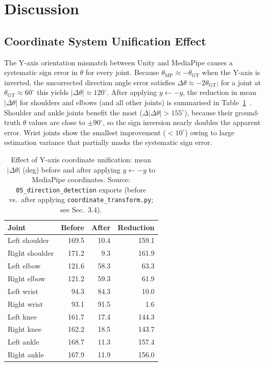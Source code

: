 \documentclass[english,fleqn]{ieej-e}
\begin{document}
\section{Discussion}

\subsection{Coordinate System Unification Effect}

The Y-axis orientation mismatch between Unity and MediaPipe causes a
systematic sign error in $\theta$ for every joint. Because
$\theta_{\text{MP}} \approx -\theta_{\text{GT}}$ when the Y-axis is
inverted, the uncorrected direction angle error satisfies
$\Delta\theta \approx -2\theta_{\text{GT}}$; for a joint at
$\theta_{\text{GT}} \approx 60^{\circ}$ this yields $|\Delta\theta| \approx 120^{\circ}$.
After applying $y \leftarrow -y$, the reduction in mean $|\Delta\theta|$
for shoulders and elbows (and all other joints) is summarised in
Table~\ref{tab:yflip_effect}~\cite{mediapipe_coord_issue}.
Shoulder and ankle joints benefit the most ($\Delta|\Delta\theta|>155^{\circ}$),
because their ground-truth $\theta$ values are close to $\pm90^{\circ}$,
so the sign inversion nearly doubles the apparent error.
Wrist joints show the smallest improvement ($<10^{\circ}$) owing to
large estimation variance that partially masks the systematic sign error.

\begin{table}[!t]
\centering
\caption{Effect of Y-axis coordinate unification: mean $|\Delta\theta|$ (deg)
  before and after applying $y \leftarrow -y$ to MediaPipe coordinates.
  Source: \texttt{05\_direction\_detection} exports (before vs.\ after
  applying \texttt{coordinate\_transform.py}; see Sec.~3.4).}
\label{tab:yflip_effect}
\small
\begin{tabular}{lrrr}
\toprule
Joint          & Before & After & Reduction \\
\midrule
Left shoulder  & 169.5 & 10.4 & 159.1 \\
Right shoulder & 171.2 &  9.3 & 161.9 \\
Left elbow     & 121.6 & 58.3 &  63.3 \\
Right elbow    & 121.2 & 59.3 &  61.9 \\
Left wrist     &  94.3 & 84.3 &  10.0 \\
Right wrist    &  93.1 & 91.5 &   1.6 \\
Left knee      & 161.7 & 17.4 & 144.3 \\
Right knee     & 162.2 & 18.5 & 143.7 \\
Left ankle     & 168.7 & 11.3 & 157.4 \\
Right ankle    & 167.9 & 11.9 & 156.0 \\
\bottomrule
\end{tabular}
\end{table}
\end{document}
